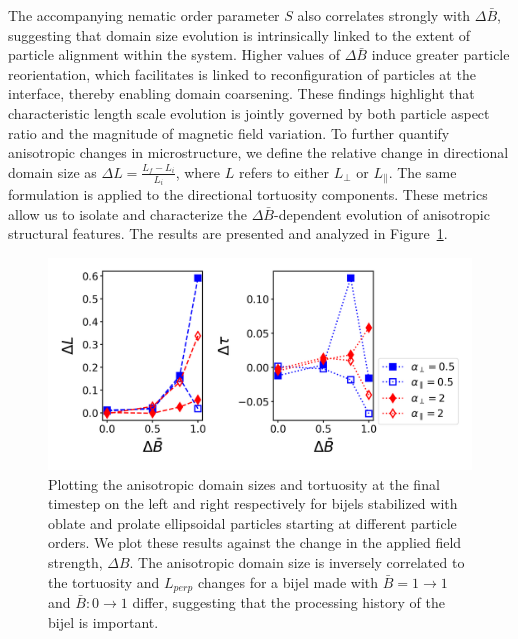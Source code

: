 The accompanying nematic order parameter \(S\) also correlates strongly with \(\Delta \bar{B}\), suggesting that domain size evolution is intrinsically linked 
to the extent of particle alignment within the system. Higher values of \(\Delta \bar{B}\) induce greater particle reorientation, which facilitates is linked to
reconfiguration of particles at the interface, thereby enabling domain coarsening. These findings highlight that characteristic length scale evolution is jointly 
governed by both particle aspect ratio and the magnitude of magnetic field variation. To further quantify anisotropic changes in microstructure, we define the 
relative change in directional domain size as \(\Delta L = \frac{L_f - L_i}{L_i}\), where \(L\) refers to either \(L_{\perp}\) or \(L_{\parallel}\). 
The same formulation is applied to the directional tortuosity components. These metrics allow us to isolate and characterize the \(\Delta \bar{B}\)-dependent 
evolution of anisotropic structural features. The results are presented and analyzed in Figure~\ref{fig:domain_size_aniso-field_up}.

\begin{figure} 
\centering 
\includegraphics[scale = 0.6]{../figures/results/paper2/domain_size_aniso-field_up.png} 
\caption{Plotting the anisotropic domain sizes and tortuosity at the final timestep on the left and right respectively for bijels stabilized with 
         oblate and prolate ellipsoidal particles starting at different particle orders. We plot these results against the change in the applied field 
         strength, $\Delta B$. The anisotropic domain size is inversely correlated to the tortuosity and $L_{perp}$ changes for 
         a bijel made with $\bar{B} = 1 \rightarrow 1$ and $\bar{B}: 0 \rightarrow 1$ differ, suggesting that the processing history of the bijel is important.} 
\label{fig:domain_size_aniso-field_up} 
\end{figure}

